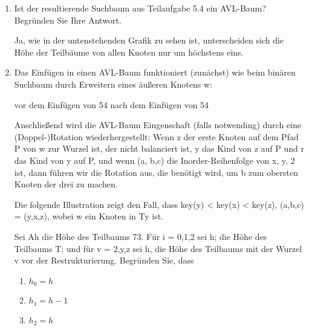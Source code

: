 \documentclass{bschlangaul-aufgabe}
\begin{document}
\begin{enumerate}
\begin{liAntwort}
\end{liAntwort}

\item Ist der resultierende Suchbaum aus Teilaufgabe 5.4 ein AVL-Baum?
Begründen Sie Ihre Antwort.

\begin{liAntwort}
Ja, wie in der untenstehenden Grafik zu sehen ist, unterscheiden sich
die Höhe der Teilbäume von allen Knoten nur um höchstens eins.


\end{liAntwort}

\item Das Einfügen in einen AVL-Baum funktioniert (zunächst) wie beim binären
Suchbaum durch Erweitern eines äußeren Knotens w:

vor dem Einfügen von 54 nach dem Einfügen von 54

Anschließend wird die AVL-Baum Eingenschaft (falls notwending) durch eine
(Doppel-)Rotation wiederhergestellt: Wenn z der erste Knoten auf dem Pfad P von w zur
Wurzel ist, der nicht balanciert ist, y das Kind von z auf P und r das Kind von y auf P,
und wenn (a, b,c) die Inorder-Reihenfolge von x, y, 2 ist, dann führen wir die Rotation aus,
die benötigt wird, um b zum obersten Knoten der drei zu machen.

Die folgende Illustration zeigt den Fall, dass key(y) < key(x) < key(z), \dh
(a,b,c) = (y,x,z), wobei w ein Knoten in Ty ist.

Sei Ah die Höhe des Teilbaums 73. Für i = 0,1,2 sei h; die Höhe des Teilbaums T; und
für v = 2,y,z sei h, die Höhe des Teilbaums mit der Wurzel v vor der Restrukturierung.
Begründen Sie, dass

\begin{enumerate}

\item $h_0 = h$

\item $h_1 = h - 1$

\item  $h_2 = h$


\end{enumerate}
\end{enumerate}
\end{document}
